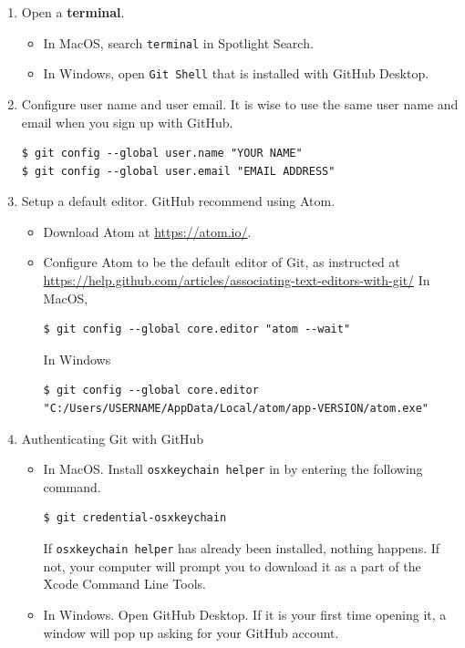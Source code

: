 \documentclass[a4paper,11pt]{article}
\begin{document}
\begin{enumerate}
\item Open a \textbf{terminal}.

\begin{itemize}
\item In MacOS, search \texttt{terminal} in Spotlight Search.
\item In Windows, open \texttt{Git Shell} that is installed with GitHub
Desktop.
\end{itemize}

\item Configure user name and user email. It is wise to use the same user
name and email when you sign up with GitHub.

\begin{verbatim}
$ git config --global user.name "YOUR NAME"
$ git config --global user.email "EMAIL ADDRESS"
\end{verbatim}

\item Setup a default editor. GitHub recommend using Atom.

\begin{itemize}
\item Download Atom at \url{https://atom.io/}.
\item Configure Atom to be the default editor of Git, as instructed at
\url{https://help.github.com/articles/associating-text-editors-with-git/}
In MacOS,
\begin{verbatim}
$ git config --global core.editor "atom --wait"
\end{verbatim}
In Windows
\begin{verbatim}
$ git config --global core.editor "C:/Users/USERNAME/AppData/Local/atom/app-VERSION/atom.exe"
\end{verbatim}
\end{itemize}

\item Authenticating Git with GitHub

\begin{itemize}
\item In MacOS. Install \texttt{osxkeychain helper} in by entering the
following command.
\begin{verbatim}
$ git credential-osxkeychain
\end{verbatim}
If \texttt{osxkeychain helper} has already been installed, nothing
happens. If not, your computer will prompt you to download it as
a part of the Xcode Command Line Tools.

\item In Windows. Open GitHub Desktop. If it is your first time opening it, a
window will pop up asking for your GitHub account.
\end{itemize}
\end{enumerate}
\end{document}
